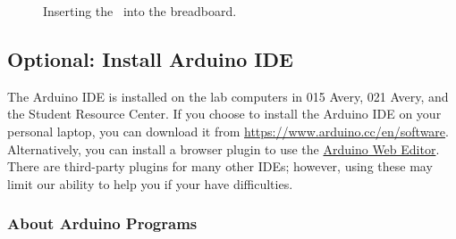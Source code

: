 \begin{figure}
    \centering
    \hfil
    \caption{Inserting the \nano\ into the breadboard.}
\end{figure}


\subsection{Optional: Install Arduino IDE}

The Arduino IDE is installed on the lab computers in 015 Avery, 021 Avery, and
the Student Resource Center. If you choose to install the Arduino IDE on your
personal laptop, you can download it from
\url{https://www.arduino.cc/en/software}. Alternatively, you can install a
browser plugin to use the
\href{https://create.arduino.cc/projecthub/Arduino_Genuino/getting-started-with-arduino-web-editor-on-various-platforms-4b3e4a}{Arduino
Web Editor}. There are third-party plugins for many other IDEs; however, using
these may limit our ability to help you if your have difficulties.

\subsubsection*{About Arduino Programs}

